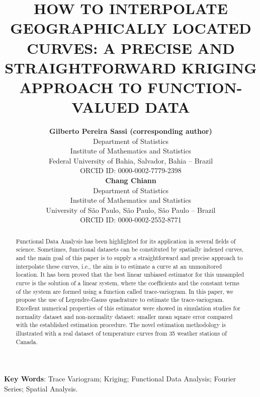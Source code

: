 \documentclass[12pt,]{article}
\author{}
\date{\vspace{-2.5em}}
\theoremstyle{definition}
\theoremstyle{definition}
\theoremstyle{definition}
\theoremstyle{remark}
\begin{document}
\title{HOW TO INTERPOLATE GEOGRAPHICALLY LOCATED CURVES: A PRECISE AND STRAIGHTFORWARD KRIGING APPROACH TO FUNCTION-VALUED DATA}
\author{{\bf Gilberto Pereira Sassi (corresponding author)} \\
    Department of Statistics\\
    Institute of Mathematics and Statistics\\
    Federal University of Bahia, Salvador, Bahia -- Brazil\\
    ORCID ID: 0000-0002-7779-2398 \\
    {\bf Chang Chiann}\\
    Department of Statistics\\
    Institute of Mathematics and Statistics\\
  University of S\~{a}o Paulo, S\~{a}o Paulo, S\~{a}o Paulo -- Brazil\\
  ORCID ID: 0000-0002-2552-8771}
\date{}

\maketitle

\newpage

\begin{abstract}
Functional Data Analysis has been highlighted for its application in several fields of science. Sometimes, functional datasets can be constituted by spatially indexed curves, and the main goal of this paper is to supply a straightforward and precise approach to interpolate these curves, i.e., the aim is to estimate a curve at an unmonitored  location. It has been proved that the best linear unbiased estimator for this unsampled curve is the solution of a linear system, where the coefficients and the constant terms of the system are formed using a function called trace-variogram. In this paper, we propose the use of Legendre-Gauss quadrature to estimate the trace-variogram. Excellent numerical properties of this estimator were showed in simulation studies for normality dataset and non-normality dataset: smaller mean square error compared with the established estimation procedure. The novel estimation methodology is illustrated with a real dataset of temperature curves from 35 weather stations of Canada.
\end{abstract}

\vskip 3mm

\noindent \textbf{Key Words}: Trace Variogram; Kriging; Functional Data Analysis; Fourier Series; Spatial Analysis.
\vskip 3mm
\end{document}
